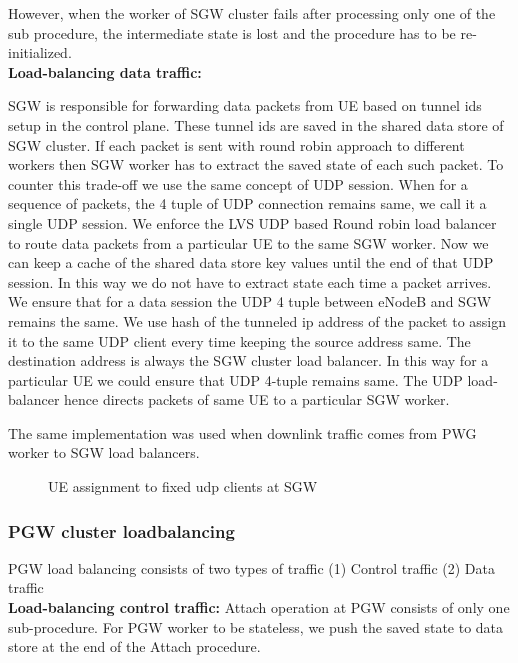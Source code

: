 \documentclass[hidelinks]{report}
\begin{document}
\par However, when the worker of SGW cluster fails after processing only one of the sub procedure, the intermediate state is lost and the procedure has to be re-initialized.\\

\textbf{Load-balancing data traffic:}

SGW is responsible for forwarding data packets from UE based on tunnel ids setup in the control plane. These tunnel ids are saved in the shared data store of SGW cluster. If each packet is sent with round robin approach to different workers then SGW worker has to extract the saved state of each such packet. To counter this trade-off we use the same concept of UDP session. When for a sequence of packets, the 4 tuple of UDP connection remains same, we call it a single UDP session. We  enforce the LVS UDP based Round robin load balancer to route data packets from a particular UE to the same SGW worker. Now we can keep a cache of the shared data store key values until the end of that UDP session. In this way we do not have to extract state each time a packet arrives. We ensure that for a data session the UDP 4 tuple between eNodeB and SGW remains the same. We use hash of the tunneled ip address of the packet to assign it to the same UDP client every time keeping the source address same. The destination address is always the SGW cluster load balancer. In this way for a particular UE we could ensure that UDP 4-tuple remains same. The UDP load-balancer hence directs packets of same UE to a particular SGW worker.

\par The same implementation was used when downlink traffic comes from PWG worker to SGW load balancers.
\begin{figure}[H]
\centering
{}
\caption{UE assignment to fixed udp clients at SGW}
\label{fig:sgwudp}
\end{figure}
\subsubsection{\textbf{PGW cluster loadbalancing}}
PGW load balancing consists of two types of traffic (1) Control traffic (2) Data traffic \\

\textbf{Load-balancing control traffic:}
Attach operation at PGW consists of only one sub-procedure. For PGW worker to be stateless, we push the saved state to data store at the end of the Attach procedure. 
\end{document}

